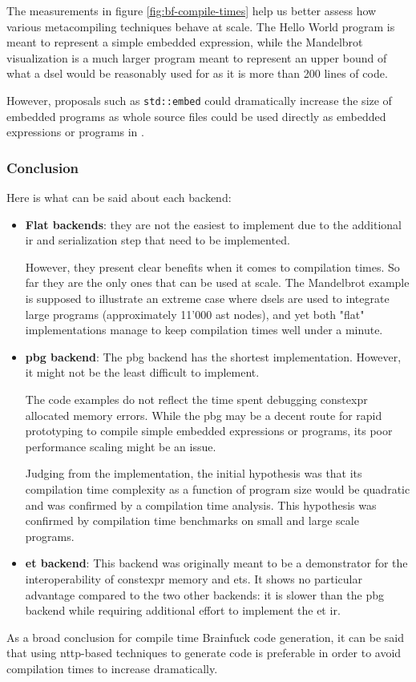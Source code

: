 \documentclass[../main]{subfiles}
\begin{document}
The measurements in figure \ref{fig:bf-compile-times} help us better assess
how various metacompiling techniques behave at scale.
The Hello World program is meant to represent a simple embedded expression,
while the Mandelbrot visualization is a much larger program meant to represent
an upper bound of what a \gls{dsel} would be reasonably used for as it is more
than 200 lines of code.

However, proposals such as \lstinline{std::embed} \cite{stdembed}
could dramatically increase the size of embedded programs as whole source files
could be used directly as embedded expressions or programs in \cpp.

\subsubsection{
  Conclusion
}

Here is what can be said about each backend:

\begin{itemize}

\item
\textbf{Flat backends}:
they are not the easiest to implement due to the additional \gls{ir}
and serialization step that need to be implemented.

However, they present clear benefits when it comes to compilation times.
So far they are the only ones that can be used at scale.
The Mandelbrot example is supposed to illustrate an extreme case where
\glspl{dsel} are used to integrate large programs (approximately 11'000
\gls{ast} nodes), and yet both "flat" implementations manage to keep compilation
times well under a minute.

\item
\textbf{\gls{pbg} backend}:
The \gls{pbg} backend has the shortest implementation.
However, it might not be the least difficult to implement.

The code examples do not reflect the time spent debugging \gls{constexpr}
allocated memory errors. While the \gls{pbg} may be a decent route for
rapid prototyping to compile simple embedded expressions or programs,
its poor performance scaling might be an issue.

Judging from the implementation, the initial hypothesis was that its
compilation time complexity as a function of program size would be quadratic
and was confirmed by a compilation time analysis.
This hypothesis was confirmed by compilation time benchmarks on small
and large scale programs.

\item
\textbf{\gls{et} backend}:
This backend was originally meant to be a demonstrator for the interoperability
of \gls{constexpr} memory and \glspl{et}. It shows no particular advantage
compared to the two other backends: it is slower than the \gls{pbg} backend while
requiring additional effort to implement the \gls{et}
\gls{ir}.

\end{itemize}

As a broad conclusion for compile time Brainfuck code generation,
it can be said that using \gls{nttp}-based techniques to generate code
is preferable in order to avoid compilation times to increase dramatically.
\end{document}
